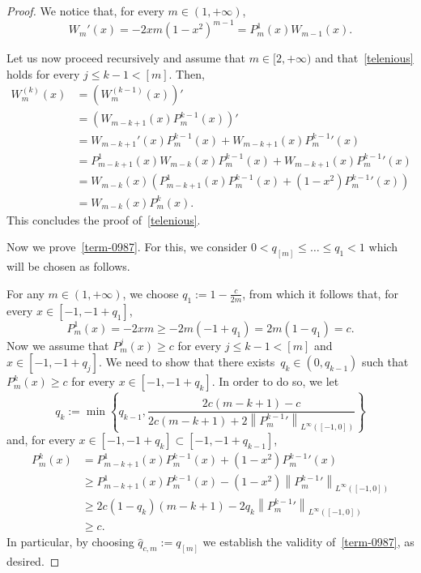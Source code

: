 \documentclass[10pt,a4paper]{amsart}
\renewcommand{\geq}{\geqslant}
\renewcommand{\leq}{\leqslant}
\begin{document}
\begin{proof} 
We notice that, for every $m\in (1,+\infty)$,
\begin{equation}\label{klkp.mtv5}
W_m'(x)=-2xm(1-x^2)^{m-1}=P_m^1(x)W_{m-1}(x).
\end{equation}

Let us now proceed recursively and assume that $m\in [2,+\infty)$ and that~\eqref{telenious} holds for every $j\leq k-1<\left[m\right]$. Then, 
\begin{equation*}
\begin{split}
W_m^{(k)}(x)&=\left(W_m^{(k-1)}(x)\right)'\\
&=\left(W_{m-k+1}(x)P_m^{k-1}(x)\right)'\\
&=W_{m-k+1}'(x)P_m^{k-1}(x)+W_{m-k+1}(x){P_m^{k-1}}'(x)\\
&=P_{m-k+1}^1(x)W_{m-k}(x)P_m^{k-1}(x)+W_{m-k+1}(x){P_m^{k-1}}'(x)\\
&=W_{m-k}(x)\left(P_{m-k+1}^1(x)P_m^{k-1}(x)+(1-x^2){P_m^{k-1}}'(x)\right)\\
&=W_{m-k}(x)P_m^k(x).
\end{split}
\end{equation*}
This concludes the proof of~\eqref{telenious}.

Now we prove~\eqref{term-0987}. For this, we consider $0<q_{\left[m\right]}\leq \dots\leq q_1<1$ which will be chosen as follows. 

For any $m\in (1,+\infty)$, we choose $q_1:=1-\frac{c}{2m}$, from which it follows that, for every $x\in \left[-1,-1+q_1\right]$,
\begin{equation*}
P_m^1(x)=-2xm\geq -2m(-1+q_1)=2m(1-q_1)=c.
\end{equation*}
Now we assume that $P_m^j(x)\geq c$ for every $j\leq k-1<\left[m\right]$ and $x\in \left[-1,-1+q_j\right]$. We need to show that there exists~$q_k\in\left(0, q_{k-1}\right)$ such that $P_m^k(x)\geq c$ for every $x\in [-1,-1+q_k]$. In order to do so, we let 
\begin{equation}
q_k:=\min \left\lbrace q_{k-1}, \frac{2c(m-k+1)-c}{2c(m-k+1)+2\left\|{P_m^{k-1}}'\right\|_{L^\infty([-1,0])}} \right\rbrace
\end{equation}
and, for every $x\in [-1,-1+q_k]\subset [-1,-1+q_{k-1}]$,
\begin{equation*}
\begin{split}
P_{m}^k(x)&=P_{m-k+1}^1(x)P_m^{k-1}(x) +(1-x^2){P_m^{k-1}}'(x)\\
&\geq P_{m-k+1}^1(x)P_m^{k-1}(x)-(1-x^2)\left\|{P_m^{k-1}}'\right\|_{L^\infty([-1,0])}\\
& \geq 2c(1-q_k)(m-k+1)-2q_k\left\|{P_m^{k-1}}'\right\|_{L^\infty([-1,0])}\\
&\geq c.
\end{split}
\end{equation*}
In particular, by choosing $\hat{q}_{c,m}:=q_{\left[m\right]}$ we establish the validity of~\eqref{term-0987}, as desired.


\end{proof}
\end{document}
